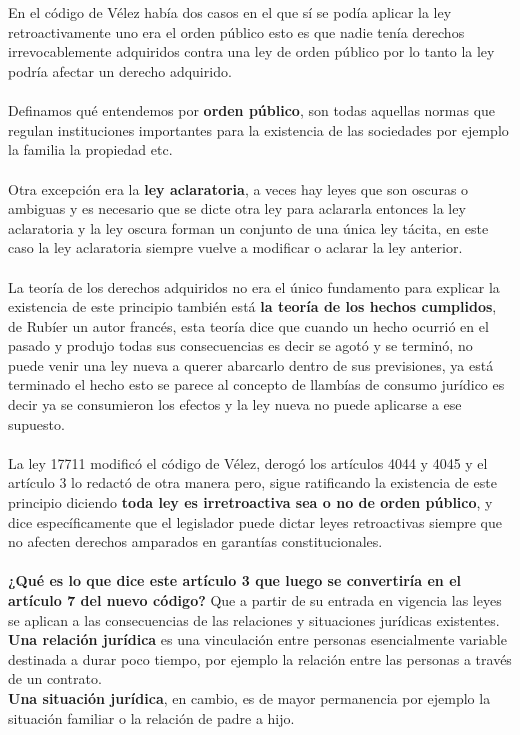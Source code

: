 \documentclass[12pt]{book}
\begin{document}
\\
\\
En el código de Vélez había dos casos en el que sí se podía aplicar la ley retroactivamente uno era el orden público esto es que nadie tenía derechos irrevocablemente adquiridos contra una ley de orden público por lo tanto la ley podría afectar un derecho adquirido.
\\ \\
Definamos qué entendemos por \textbf{orden público}, son todas aquellas normas que regulan instituciones importantes para la existencia de las sociedades por ejemplo la familia la propiedad etc.
\\ \\
Otra excepción era la \textbf{ley aclaratoria}, a veces hay leyes que son oscuras o ambiguas y es necesario que se dicte otra ley para aclararla entonces la ley aclaratoria y la ley oscura forman un conjunto de una única ley tácita, en este caso la ley aclaratoria siempre vuelve a modificar o aclarar la ley anterior.
\\ \\
La teoría de los derechos adquiridos no era el único fundamento para explicar la existencia de este principio también está \textbf{la teoría de los hechos cumplidos}, de Rubíer un autor francés, esta teoría dice que cuando un hecho ocurrió en el pasado y produjo todas sus consecuencias es decir se agotó y se terminó, no puede venir una ley nueva a querer abarcarlo dentro de sus previsiones, ya está terminado el hecho esto se parece al concepto de llambías de consumo jurídico es decir ya se consumieron los efectos y la ley nueva no puede aplicarse a ese supuesto.
\\ \\
La ley 17711 modificó el código de Vélez, derogó los artículos 4044 y 4045 y el artículo 3 lo redactó de otra manera pero, sigue ratificando la existencia de este principio diciendo \textbf{toda ley es irretroactiva sea o no de orden público}, y dice específicamente que el legislador puede dictar leyes retroactivas siempre que no afecten derechos amparados en garantías constitucionales.
\\ \\
\textbf{¿Qué es lo que dice este artículo 3 que luego se convertiría en el artículo 7 del nuevo código?}
Que a partir de su entrada en vigencia las leyes se aplican a las consecuencias de las relaciones y situaciones jurídicas existentes.
\\
\textbf{Una relación jurídica} es una vinculación entre personas esencialmente variable destinada a durar poco tiempo, por ejemplo la relación entre las personas a través de un contrato.
\\
\textbf{Una situación jurídica}, en cambio, es de mayor permanencia por ejemplo la situación familiar o la relación de padre a hijo.
\end{document}

